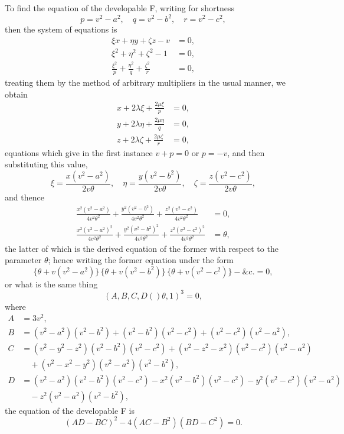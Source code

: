 \documentclass[11pt,a4paper]{book}
\providecommand{\qform}[1]{(#1)}
\begin{document}
To find the equation of the developable F, writing for shortness
\[
p = v^{2} - a^{2},\quad q = v^{2} - b^{2},\quad r = v^{2} - c^{2},
\]
then the system of equations is
\begin{align*}
\xi x + \eta y + \zeta z - v &= 0,\\
\xi^{2} + \eta^{2} + \zeta^{2} - 1 &= 0,\\
\frac{\xi^{2}}{p} + \frac{\eta^{2}}{q} + \frac{\zeta^{2}}{r} &= 0,
\end{align*}
treating them by the method of arbitrary multipliers in the usual manner, we obtain
\begin{align*}
x + 2\lambda\xi + \frac{2\mu\xi}{p} &= 0,\\
y + 2\lambda\eta + \frac{2\mu\eta}{q} &= 0,\\
z + 2\lambda\zeta + \frac{2\mu\zeta}{r} &= 0,
\end{align*}
equations which give in the first instance $v + p = 0$ or $p = -v$, and then substituting
this value,
\[
\xi = \frac{x(v^{2} - a^{2})}{2v\theta},\quad
\eta = \frac{y(v^{2} - b^{2})}{2v\theta},\quad
\zeta = \frac{z(v^{2} - c^{2})}{2v\theta},
\]
and thence
\begin{align*}
\frac{x^{2}(v^{2} - a^{2})}{4v^{2}\theta^{2}} + \frac{y^{2}(v^{2} - b^{2})}{4v^{2}\theta^{2}}
+ \frac{z^{2}(v^{2} - c^{2})}{4v^{2}\theta^{2}} &= 0,\\
\frac{x^{2}(v^{2} - a^{2})^{2}}{4v^{2}\theta^{2}} + \frac{y^{2}(v^{2} - b^{2})^{2}}{4v^{2}\theta^{2}}
+ \frac{z^{2}(v^{2} - c^{2})^{2}}{4v^{2}\theta^{2}} &= \theta,
\end{align*}
the latter of which is the derived equation of the former with respect to the parameter
$\theta$; hence writing the former equation under the form
\[
\{\theta + v(v^{2} - a^{2})\}\,\{\theta + v(v^{2} - b^{2})\}\,\{\theta + v(v^{2} - c^{2})\}
- \&\mathrm{c}. = 0,
\]
or what is the same thing
\[
(A, B, C, D\!\qform{}{\theta, 1})^{3} = 0,
\]
where
\begin{align*}
A &= 3v^{2},\\
B &= (v^{2} - a^{2})(v^{2} - b^{2}) + (v^{2} - b^{2})(v^{2} - c^{2}) + (v^{2} - c^{2})(v^{2} - a^{2}),\\
C &= (v^{2} - y^{2} - z^{2})(v^{2} - b^{2})(v^{2} - c^{2}) + (v^{2} - z^{2} - x^{2})(v^{2} - c^{2})(v^{2} - a^{2})\\
&\quad + (v^{2} - x^{2} - y^{2})(v^{2} - a^{2})(v^{2} - b^{2}),\\
D &= (v^{2} - a^{2})(v^{2} - b^{2})(v^{2} - c^{2}) - x^{2}(v^{2} - b^{2})(v^{2} - c^{2})
- y^{2}(v^{2} - c^{2})(v^{2} - a^{2})\\
&\quad - z^{2}(v^{2} - a^{2})(v^{2} - b^{2}),
\end{align*}
the equation of the developable F is
\[
(AD - BC)^{2} - 4(AC - B^{2})(BD - C^{2}) = 0.
\]
\end{document}
